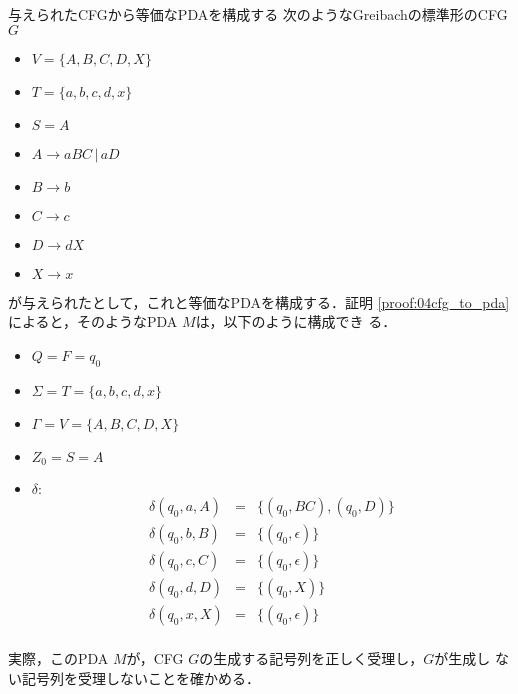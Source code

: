 \setcounter{myfootnote}{\value{footnote}}
\addtocounter{myfootnote}{-1}
\addtocounter{myfootnote}{1}


\begin{myexample}{与えられたCFGから等価なPDAを構成する}
 次のようなGreibachの標準形のCFG $G$
 \begin{itemize}
  \item $V = \{A, B, C, D, X\}$
  \item $T = \{a, b, c, d, x\}$
  \item $S = A$
  \item $A \rightarrow aBC \, | \, aD$
  \item $B \rightarrow b$
  \item $C \rightarrow c$
  \item $D \rightarrow dX$
  \item $X \rightarrow x$
 \end{itemize}
 が与えられたとして，これと等価なPDAを構成する．証明
 \ref{proof:04cfg_to_pda}によると，そのようなPDA $M$は，以下のように構成でき
 る．
 
 \begin{itemize}
  \item $Q = F = {q_0}$
  \item $\Sigma = T = \{a, b, c, d, x\}$
  \item $\Gamma = V = \{A, B, C, D, X\}$
  \item $Z_0 = S = A$
  \item $\delta :$
       \begin{eqnarray*}
        \delta(q_0, a, A) &=& \{(q_0, BC), (q_0, D)\} \\
        \delta(q_0, b, B) &=& \{(q_0, \epsilon)\} \\
        \delta(q_0, c, C) &=& \{(q_0, \epsilon)\} \\
        \delta(q_0, d, D) &=& \{(q_0, X)\} \\
        \delta(q_0, x, X) &=& \{(q_0, \epsilon)\} \\
       \end{eqnarray*}
 \end{itemize}

 実際，このPDA $M$が，CFG $G$の生成する記号列を正しく受理し，$G$が生成し
 ない記号列を受理しないことを確かめる．


\end{myexample}
